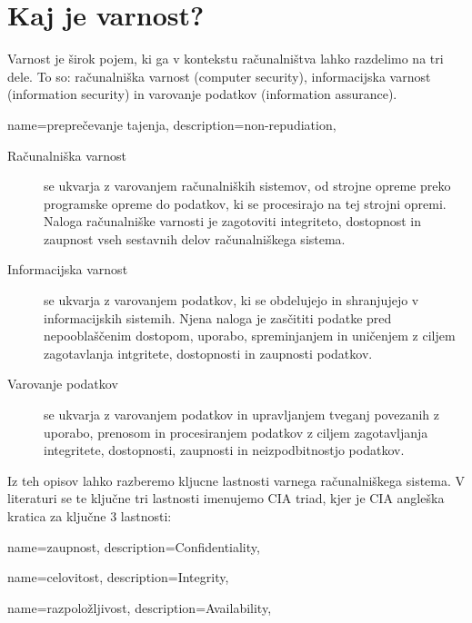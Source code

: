 \documentclass[12pt,a4paper,openany]{book}
\begin{document}
\section{Kaj je varnost?}
Varnost je širok pojem, ki ga v kontekstu računalništva lahko razdelimo na tri dele. To so: računalniška varnost (computer security), informacijska varnost (information security) in varovanje podatkov (information assurance).

{
  name=preprečevanje tajenja,
  description={non-repudiation},
}

\begin{description}

	\item[Računalniška varnost] se ukvarja z varovanjem računalniških sistemov, od strojne opreme preko programske opreme do podatkov, ki se procesirajo na tej strojni opremi. Naloga računalniške varnosti je zagotoviti integriteto, dostopnost in zaupnost vseh sestavnih delov računalniškega sistema.

\item[Informacijska varnost] se ukvarja z varovanjem podatkov, ki se obdelujejo in shranjujejo v informacijskih sistemih. Njena naloga je zasčititi podatke pred nepooblaščenim dostopom, uporabo, spreminjanjem in uničenjem z ciljem zagotavlanja intgritete, dostopnosti in zaupnosti podatkov.

\item[Varovanje podatkov] se ukvarja z varovanjem podatkov in upravljanjem tveganj povezanih z uporabo, prenosom in procesiranjem podatkov z ciljem zagotavljanja integritete, dostopnosti, zaupnosti in neizpodbitnostjo podatkov.
\end{description}

Iz teh opisov lahko razberemo kljucne lastnosti varnega računalniškega sistema. V literaturi se te ključne tri lastnosti imenujemo CIA triad, kjer je CIA angleška kratica za ključne 3 lastnosti:

{
  name=zaupnost,
  description={Confidentiality},
}

{
  name=celovitost,
  description={Integrity},
}

{
  name=razpoložljivost,
  description={Availability},
}
\end{document}
